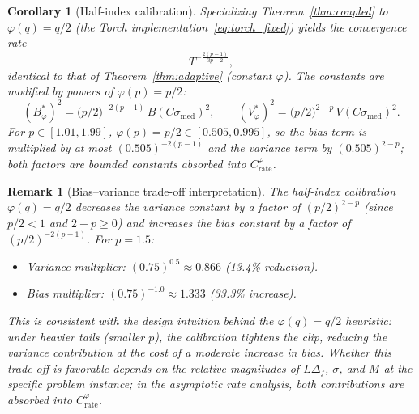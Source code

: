 \documentclass[11pt]{article}
\newtheorem{corollary}[theorem]{Corollary}
\newtheorem{remark}[theorem]{Remark}
\theoremstyle{definition}
\begin{document}
\begin{corollary}[Half-index calibration]\label{cor:half_index}
Specializing Theorem~\ref{thm:coupled} to $\varphi(q) = q/2$ (the Torch
implementation~\eqref{eq:torch_fixed}) yields the convergence rate
\[
  T^{-\frac{2(p-1)}{3p-2}},
\]
identical to that of Theorem~\ref{thm:adaptive} (constant $\varphi$). The
constants are modified by powers of $\varphi(p) = p/2$:
\begin{equation}\label{eq:half_index_constants}
  (B^{*}_\varphi)^2 = \bigl(p/2\bigr)^{-2(p-1)}\, B(C\sigma_{\mathrm{med}})^2,
  \qquad
  (V^{*}_\varphi)^2 = \bigl(p/2\bigr)^{2-p}\, V(C\sigma_{\mathrm{med}})^2.
\end{equation}
For $p \in [1.01, 1.99]$, $\varphi(p) = p/2 \in [0.505, 0.995]$, so the
bias term is multiplied by at most $(0.505)^{-2(p-1)}$ and the variance
term by $(0.505)^{2-p}$; both factors are bounded constants absorbed into
$C_{\mathrm{rate}}^\varphi$.
\end{corollary}

\begin{remark}[Bias--variance trade-off interpretation]\label{rem:bv_tradeoff}
The half-index calibration $\varphi(q) = q/2$ \emph{decreases} the variance
constant by a factor of $(p/2)^{2-p}$ (since $p/2 < 1$ and $2-p \geq 0$)
and \emph{increases} the bias constant by a factor of $(p/2)^{-2(p-1)}$.
For $p = 1.5$:
\begin{itemize}[noitemsep,leftmargin=*]
  \item Variance multiplier: $(0.75)^{0.5} \approx 0.866$ (13.4\% reduction).
  \item Bias multiplier: $(0.75)^{-1.0} \approx 1.333$ (33.3\% increase).
\end{itemize}
This is consistent with the design intuition behind the
$\varphi(q) = q/2$ heuristic: under heavier tails (smaller $p$), the
calibration tightens the clip, reducing the variance contribution at the
cost of a moderate increase in bias. Whether this trade-off is favorable
depends on the relative magnitudes of $L\Delta_f$, $\sigma$, and $M$ at
the specific problem instance; in the asymptotic rate analysis, both
contributions are absorbed into $C_{\mathrm{rate}}^\varphi$.
\end{remark}
\end{document}

